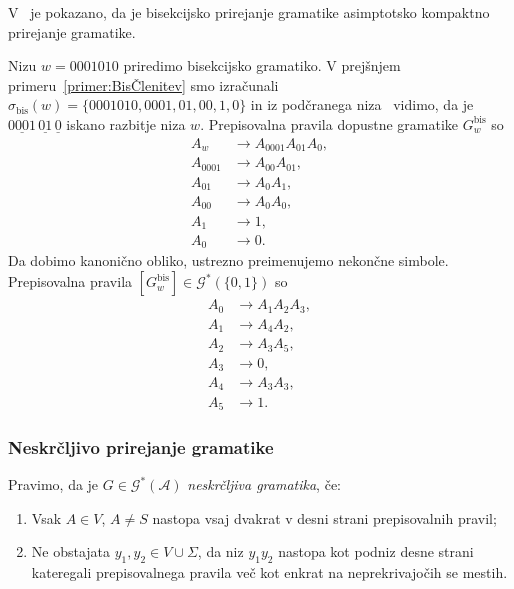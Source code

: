 \documentclass[fin1, tisk]{fmfdelo}
\newcommand{\A}{\mathcal{A}}
\newcommand{\G}{\mathcal{G}}
\theoremstyle{definition}
\begin{document}
V~\cite{KiefferYangEt2000} je pokazano, da je bisekcijsko prirejanje gramatike asimptotsko kompaktno 
prirejanje gramatike.

\begin{primer}
    Nizu $w = 0001010$ priredimo bisekcijsko gramatiko.  V prejšnjem 
    primeru~\ref{primer:BisČlenitev} smo izračunali 
    $\sigma_{\text{bis}}(w) = \{ 0001010, 0001, 01, 00, 1, 0 \}$ in iz podčranega 
    niza~ vidimo, da je $\underline{0001} \, \underline{01} \, \underline{0}$
    iskano razbitje niza $w$. Prepisovalna pravila dopustne gramatike $G^\text{bis}_w$ so
    \begin{align*}
        A_w &\rightarrow A_{0001}A_{01}A_{0}, \\
        A_{0001} &\rightarrow A_{00}A_{01}, \\
        A_{01} &\rightarrow A_{0}A_{1}, \\
        A_{00} &\rightarrow A_{0}A_{0}, \\
        A_{1} &\rightarrow 1, \\
        A_{0} &\rightarrow 0.
    \end{align*}
    Da dobimo kanonično obliko, ustrezno preimenujemo nekončne simbole.
    Prepisovalna pravila $[G^\text{bis}_w] \in \G^*(\{ 0, 1 \})$ so
    \begin{align*}
        A_0 &\rightarrow A_1A_2A_3, \\
        A_1 &\rightarrow A_4A_2, \\
        A_2 &\rightarrow A_3A_5, \\
        A_3 &\rightarrow 0, \\
        A_4 &\rightarrow A_3A_3, \\
        A_5 &\rightarrow 1.
    \end{align*}
\end{primer}

\subsubsection{Neskrčljivo prirejanje gramatike}

\begin{definicija}
    Pravimo, da je $G \in \G^*(\A)$ \emph{neskrčljiva gramatika}, če:
    \begin{enumerate}
        \item Vsak $A \in V$, $A \neq S$ nastopa vsaj dvakrat v desni strani prepisovalnih pravil;
        \item Ne obstajata $y_1,y_2 \in V \cup \Sigma$, da niz $y_1y_2$ nastopa kot podniz desne 
        strani kateregali prepisovalnega pravila več kot enkrat na neprekrivajočih se mestih. 
    \end{enumerate}
\end{definicija}
\end{document}
